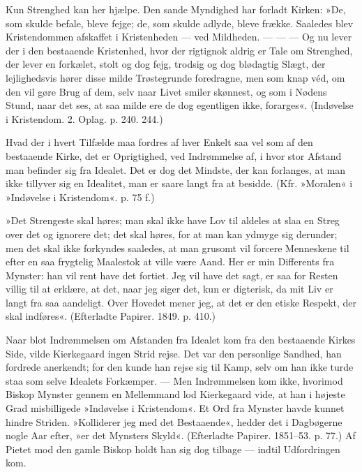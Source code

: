 \documentclass[12pt,a4paper,openany]{book}
\newcommand{\opage}[1]{\marginnote{\footnotesize\textit{[#1]}}}
\begin{document}
Kun Strenghed kan her hjælpe. Den sande Myndighed
har forladt Kirken: »De, som skulde befale, bleve
fejge; de, som skulde adlyde, bleve frække. Saaledes
blev Kristendommen afskaffet i Kristenheden --- ved Mildheden.
--- --- --- Og nu lever der i den bestaaende Kristenhed,
hvor der rigtignok aldrig er Tale om Strenghed,
der lever en forkælet, stolt og dog fejg, trodsig og dog
blødagtig Slægt, der lejlighedsvis hører disse milde Trøstegrunde
foredragne, men som knap véd, om den vil gøre
Brug af dem, selv naar Livet smiler skønnest, og som i
Nødens Stund, naar det ses, at saa milde ere de dog
egentligen ikke, forarges«. (Indøvelse i Kristendom. 2. Oplag.
p. 240. 244.)

Hvad der i hvert Tilfælde maa fordres af hver
Enkelt saa vel som af den bestaaende Kirke, det er Oprigtighed,
ved Indrømmelse af, i hvor stor Afstand man
befinder sig fra Idealet. Det er dog det Mindste, der
kan forlanges, at man ikke tillyver sig en Idealitet, man
er saare langt fra at besidde. (Kfr. »Moralen« i »Indøvelse
i Kristendom«. p. 75 f.)

»Det Strengeste skal høres; man skal ikke have Lov
til aldeles at slaa en Streg over det og ignorere det;
det skal høres, for at man kan ydmyge sig derunder;
men det skal ikke forkyndes saaledes, at man grusomt
vil forcere Menneskene til efter en saa frygtelig Maalestok
at ville være Aand. Her er min Differents fra Mynster:
han vil rent have det fortiet. Jeg vil have det sagt,
er saa for Resten villig til at erklære, at det, naar jeg
\opage{136}siger det, kun er digterisk, da mit Liv er langt fra saa
aandeligt. Over Hovedet mener jeg, at det er den etiske
Respekt, der skal indføres«. (Efterladte Papirer. 1849.
p. 410.)

Naar blot Indrømmelsen om Afstanden fra Idealet
kom fra den bestaaende Kirkes Side, vilde Kierkegaard
ingen Strid rejse. Det var den personlige Sandhed, han
fordrede anerkendt; for den kunde han rejse sig til Kamp,
selv om han ikke turde staa som selve Idealets Forkæmper.
--- Men Indrømmelsen kom ikke, hvorimod Biskop
Mynster gennem en Mellemmand lod Kierkegaard
vide, at han i højeste Grad misbilligede »Indøvelse i
Kristendom«. Et Ord fra Mynster havde kunnet hindre
Striden. »Kolliderer jeg med det Bestaaende«, hedder
det i Dagbøgerne nogle Aar efter, »er det Mynsters Skyld«.
(Efterladte Papirer. 1851--53. p. 77.) Af Pietet mod den
gamle Biskop holdt han sig dog tilbage --- indtil Udfordringen
kom.
\end{document}
